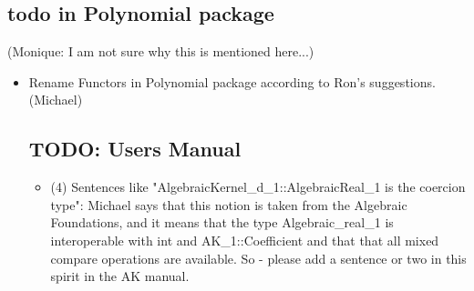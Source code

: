 \subsection{todo in Polynomial package} 
(Monique: I am not sure why this is mentioned here...)
\begin{itemize}
\item 
Rename Functors in Polynomial package according to Ron's 
suggestions. (Michael)

\subsection{TODO: Users Manual}

\begin{itemize}
\item (4) Sentences like "AlgebraicKernel\_d\_1::AlgebraicReal\_1 is the
coercion type":
Michael says that this notion is taken from the Algebraic Foundations, and it
means that the type Algebraic\_real\_1 is interoperable with int and
AK\_1::Coefficient and that that all mixed compare operations are available.
So - please add a sentence or two in this spirit in the AK manual.
\end{itemize}

\end{itemize} 


